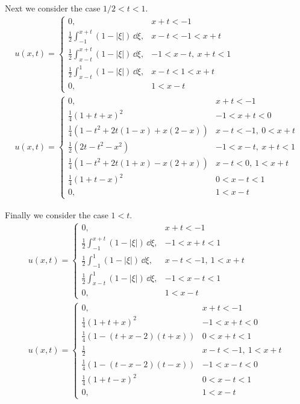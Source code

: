 {\begin{Solution}
\begin{enumerate}
    Next we consider the case $1/2 < t < 1$.
    \begin{gather*}
      u(x,t) = \begin{cases}
        0, &x+t < -1
        \\
        \frac{1}{2} \int_{-1}^{x+t} (1 - |\xi|) \,\dd \xi, &x-t < -1 < x+t
        \\
        \frac{1}{2} \int_{x-t}^{x+t} (1 - |\xi|) \,\dd \xi, &-1 < x-t,\ x+t < 1
        \\
        \frac{1}{2} \int_{x-t}^{1} (1 - |\xi|) \,\dd \xi, &x-t < 1 < x+t
        \\
        0, &1 < x-t
      \end{cases}
      \\
      u(x,t) = \begin{cases}
        0, &x+t < -1
        \\
        \frac{1}{4} (1 + t + x)^2 &-1 < x+t < 0
        \\
        \frac{1}{4} ( 1 - t^2 + 2 t (1 - x) + x(2 - x) ) &x-t < -1,\  0 < x+t
        \\
        \frac{1}{2} (2 t - t^2 - x^2) &-1 < x-t,\ x+t < 1
        \\
        \frac{1}{4} ( 1 - t^2 + 2 t (1 + x) - x(2 + x) ) &x-t < 0,\  1 < x+t
        \\
        \frac{1}{4} (1 + t - x)^2 &0 < x-t < 1
        \\
        0, &1 < x-t
      \end{cases}
    \end{gather*}


    Finally we consider the case $1 < t$.
    \begin{gather*}
      u(x,t) = \begin{cases}
        0, &x+t < -1
        \\
        \frac{1}{2} \int_{-1}^{x+t} (1 - |\xi|) \,\dd \xi, &-1 < x+t < 1
        \\
        \frac{1}{2} \int_{-1}^{1} (1 - |\xi|) \,\dd \xi, &x-t < -1,\ 1 < x+t
        \\
        \frac{1}{2} \int_{x-t}^{1} (1 - |\xi|) \,\dd \xi, &-1 < x-t < 1
        \\
        0, &1 < x-t
      \end{cases}
      \\
      u(x,t) = \begin{cases}
        0, &x+t < -1
        \\
        \frac{1}{4} (1 + t + x)^2 &-1 < x+t < 0
        \\
        \frac{1}{4} ( 1 - ( t + x - 2 )( t + x ) ) &0 < x+t < 1
        \\
        \frac{1}{2} &x-t < -1,\ 1 < x+t
        \\
        \frac{1}{4} ( 1 - ( t - x - 2 )( t - x ) ) &-1 < x-t < 0
        \\
        \frac{1}{4} (1 + t - x)^2 &0 < x-t < 1
        \\
        0, &1 < x-t
      \end{cases}
    \end{gather*}




\end{enumerate}
\end{Solution}}
